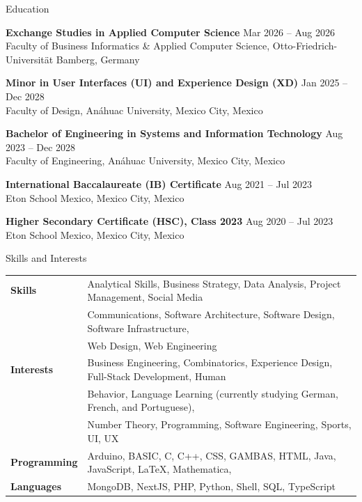\documentclass{resume} %
\begin{document}

\begin{rSection}{ Education }

{\bf{Exchange Studies in Applied Computer Science}} \hfill{Mar 2026 -- Aug 2026}
\\
Faculty of Business Informatics \& Applied Computer Science, Otto-Friedrich-Universität Bamberg, Germany

{\bf{Minor in User Interfaces (UI) and Experience Design (XD)}} \hfill{Jan 2025 -- Dec 2028}
\\
Faculty of Design, Anáhuac University, Mexico City, Mexico

{\bf Bachelor of Engineering in Systems and Information Technology} \hfill {Aug 2023 -- Dec 2028}
\\ 
Faculty of Engineering, Anáhuac University, Mexico City, Mexico

{\bf{International Baccalaureate (IB) Certificate}} \hfill{Aug 2021 -- Jul 2023}
\\
Eton School Mexico, Mexico City, Mexico

{\bf Higher Secondary Certificate (HSC), Class 2023} \hfill {Aug 2020 -- Jul 2023}
\\ 
Eton School Mexico, Mexico City, Mexico

\end{rSection}


\begin{rSection}{ Skills and Interests }

\begin{tabular}{ @{} >{\bfseries}l @{\hspace{4ex}} l }  
    Skills & Analytical Skills, Business Strategy, Data Analysis, Project Management, Social Media
        \\& Communications, Software Architecture, Software Design, Software Infrastructure,
        \\& Web Design, Web Engineering \\
    Interests & Business Engineering, Combinatorics, Experience Design, Full-Stack Development, Human 
        \\& Behavior, Language Learning (currently studying German, French, and Portuguese), 
        \\& Number Theory, Programming, Software Engineering, Sports, UI, UX \\
    Programming & Arduino, BASIC, C, C++, CSS, GAMBAS, HTML, Java, JavaScript, \LaTeX, Mathematica, \\
    Languages & MongoDB, NextJS, PHP, Python, Shell, SQL, TypeScript
\end{tabular}   

\end{rSection}
\end{document}
